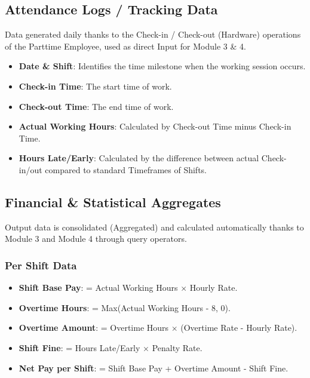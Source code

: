 \subsection{Attendance Logs / Tracking Data}
Data generated daily thanks to the Check-in / Check-out (Hardware) operations of the Parttime Employee, used as direct Input for Module 3 \& 4.
\begin{itemize}
    \item \textbf{Date \& Shift}: Identifies the time milestone when the working session occurs.
    \item \textbf{Check-in Time}: The start time of work.
    \item \textbf{Check-out Time}: The end time of work.
    \item \textbf{Actual Working Hours}: Calculated by Check-out Time minus Check-in Time.
    \item \textbf{Hours Late/Early}: Calculated by the difference between actual Check-in/out compared to standard Timeframes of Shifts.
\end{itemize}

\subsection{Financial \& Statistical Aggregates}
Output data is consolidated (Aggregated) and calculated automatically thanks to Module 3 and Module 4 through query operators.

\subsubsection{Per Shift Data}
\begin{itemize}
    \item \textbf{Shift Base Pay}: = Actual Working Hours $\times$ Hourly Rate.
    \item \textbf{Overtime Hours}: = Max(Actual Working Hours - 8, 0).
    \item \textbf{Overtime Amount}: = Overtime Hours $\times$ (Overtime Rate - Hourly Rate).
    \item \textbf{Shift Fine}: = Hours Late/Early $\times$ Penalty Rate.
    \item \textbf{Net Pay per Shift}: = Shift Base Pay + Overtime Amount - Shift Fine.
\end{itemize}

